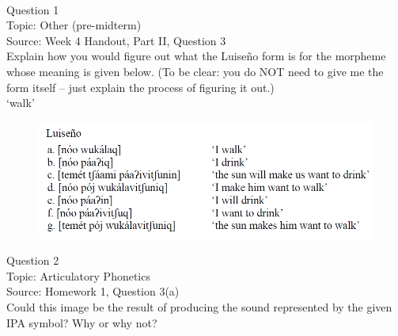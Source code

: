 \documentclass[12pt]{article}
\begin{document}
\newpage

\begin{center}
\textbf{{\color{red}{\HUGE END OF EXAM}}}\\

\end{center}
\newpage

\begin{center}
\textbf{{\color{blue}{\HUGE START OF EXAM\\}}}

\textbf{{\color{blue}{\HUGE Student ID: 70875\\}}}

\textbf{{\color{blue}{\HUGE 4:30\\}}}

\end{center}
\newpage

{\large Question 1}\\

Topic: Other (pre-midterm)\\
Source: Week 4 Handout, Part II, Question 3\\

Explain how you would figure out what the Luiseño form is for the morpheme whose meaning is given below. (To be clear: you do NOT need to give me the form itself -- just explain the process of figuring it out.)\\

‘walk’

\begin{figure}[H]
\includegraphics{../images/luiseno.png}
\end{figure}

\newpage

{\large Question 2}\\

Topic: Articulatory Phonetics\\
Source: Homework 1, Question 3(a)\\

Could this image be the result of producing the sound represented by the given IPA symbol? Why or why not?\\
\end{document}
